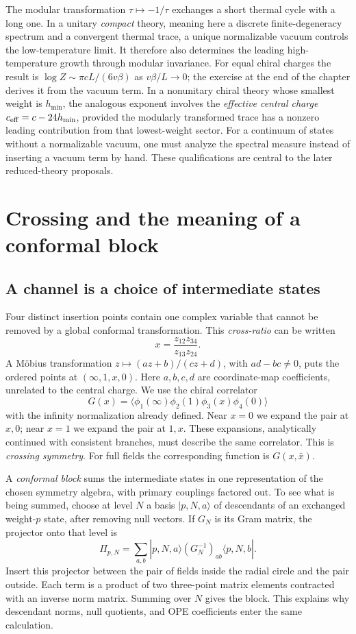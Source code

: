 The modular transformation $\tau\mapsto-1/\tau$ exchanges a short
thermal cycle with a long one. In a unitary \emph{compact} theory,
meaning here a discrete finite-degeneracy spectrum and a convergent
thermal trace, a unique normalizable vacuum controls the
low-temperature limit. It therefore also determines the leading
high-temperature growth through modular invariance. For equal
chiral charges the result is
$\log Z\sim\pi cL/(6v\beta)$ as $v\beta/L\to0$; the exercise
at the end of the chapter derives it from the vacuum term.
In a nonunitary chiral theory whose smallest
weight is $h_{\min}$, the analogous exponent involves the
\emph{effective central charge} $c_{\rm eff}=c-24h_{\min}$,
provided the modularly transformed trace has a nonzero leading
contribution from that lowest-weight sector. For a continuum of states without a
normalizable vacuum, one must analyze the spectral measure instead
of inserting a vacuum term by hand. These qualifications are central
to the later reduced-theory proposals.

\section{Crossing and the meaning of a conformal block}
\label{sec:cft-blocks}

\subsection{A channel is a choice of intermediate states}

Four distinct insertion points contain one complex variable that
cannot be removed by a global conformal transformation. This
\emph{cross-ratio} can be written
\[
 x=\frac{z_{12}z_{34}}{z_{13}z_{24}}.
\]
A M\"obius transformation $z\mapsto(az+b)/(cz+d)$, with
$ad-bc\ne0$, puts the ordered points at $(\infty,1,x,0)$.
Here $a,b,c,d$ are coordinate-map coefficients, unrelated to the
central charge. We use the chiral correlator
\[
 G(x)=\langle\phi_1(\infty)\phi_2(1)\phi_3(x)\phi_4(0)\rangle
\]
with the infinity normalization already defined. Near $x=0$ we
expand the pair at $x,0$; near $x=1$ we expand the pair at $1,x$.
These expansions, analytically continued with consistent branches,
must describe the same correlator. This is \emph{crossing symmetry}.
For full fields the corresponding function is $G(x,\bar x)$.

A \emph{conformal block} sums the intermediate states in one
representation of the chosen symmetry algebra, with primary
couplings factored out. To see what is being summed, choose at level
$N$ a basis $|p,N,a\rangle$ of descendants of an exchanged
weight-$p$ state, after removing null vectors. If $G_N$ is its Gram
matrix, the projector onto that level is
\[
 \Pi_{p,N}=\sum_{a,b}|p,N,a\rangle
                    (G_N^{-1})_{ab}\langle p,N,b|.
\]
Insert this projector between the pair of fields inside the radial
circle and the pair outside. Each term is a product of two
three-point matrix elements contracted with an inverse norm matrix.
Summing over $N$ gives the block. This explains why descendant
norms, null quotients, and OPE coefficients enter the same calculation.

